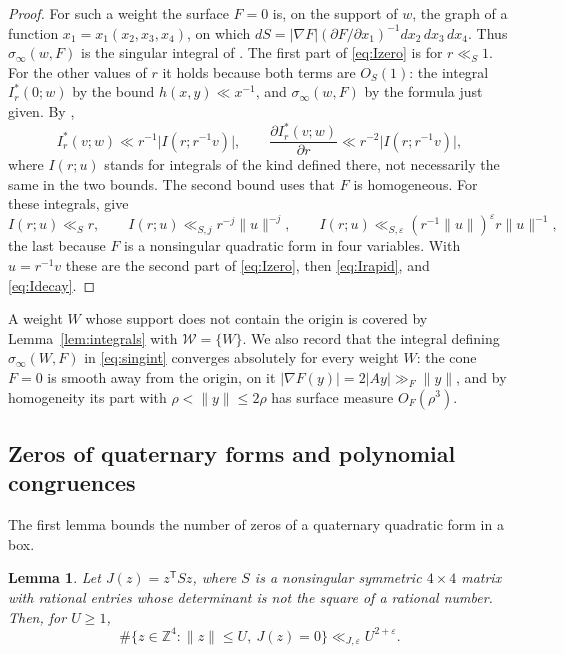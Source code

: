 \documentclass[11pt]{amsart}
\numberwithin{equation}{section}
\numberwithin{figure}{section}
\newtheorem{lemma}{Lemma}[section]
\theoremstyle{definition}
\newcommand{\Z}{\mathbb{Z}}
\newcommand{\eps}{\varepsilon}
\newcommand{\abs}[1]{\lvert #1\rvert}
\begin{document}
\begin{proof}
For such a weight the surface $F=0$ is, on the support of $w$, the
graph of a function $x_1=x_1(x_2,x_3,x_4)$, on which
$dS=\abs{\nabla F}(\partial F/\partial x_1)^{-1}dx_2\,dx_3\,dx_4$.
Thus $\sigma_\infty(w,F)$ is the singular integral of
\cite[Theorem~3]{HB}. The first part of \eqref{eq:Izero} is
\cite[Lemma~13]{HB} for $r\ll_S1$. For the other values of $r$ it
holds because both terms are $O_S(1)$: the integral $I_r^*(0;w)$ by
the bound $h(x,y)\ll x^{-1}$, and $\sigma_\infty(w,F)$ by the formula
just given. By \cite[Lemma~14]{HB},
\[
 I_r^*(v;w)\ll r^{-1}\abs{I(r;r^{-1}v)},\qquad
 \frac{\partial I_r^*(v;w)}{\partial r}\ll r^{-2}\abs{I(r;r^{-1}v)},
\]
where $I(r;u)$ stands for integrals of the kind defined there, not
necessarily the same in the two bounds. The second bound uses that
$F$ is homogeneous. For these integrals,
\cite[Lemmas~15, 18 and~22]{HB} give
\[
 I(r;u)\ll_Sr,\qquad
 I(r;u)\ll_{S,j}r^{-j}\lVert u\rVert^{-j},\qquad
 I(r;u)\ll_{S,\eps}(r^{-1}\lVert u\rVert)^\eps r\lVert u\rVert^{-1},
\]
the last because $F$ is a nonsingular quadratic form in four
variables. With $u=r^{-1}v$ these are the second part of
\eqref{eq:Izero}, then \eqref{eq:Irapid}, and \eqref{eq:Idecay}.
\end{proof}

A weight $W$ whose support does not contain the origin is covered by
Lemma~\ref{lem:integrals} with $\mathcal W=\{W\}$. We also record
that the integral defining $\sigma_\infty(W,F)$ in
\eqref{eq:singint} converges absolutely for every weight $W$: the
cone $F=0$ is smooth away from the origin, on it
$\abs{\nabla F(y)}=2\abs{Ay}\gg_F\lVert y\rVert$, and by homogeneity
its part with $\rho<\lVert y\rVert\le2\rho$ has surface measure
$O_F(\rho^3)$.

\subsection{Zeros of quaternary forms and polynomial congruences}\label{sec:congruences}

The first lemma bounds the number of zeros of a quaternary quadratic
form in a box.

\begin{lemma}\label{lem:quadriccount}
Let $J(z)=z^{\mathsf T}Sz$, where $S$ is a nonsingular symmetric
$4\times4$ matrix with rational entries whose determinant is not the
square of a rational number. Then, for $U\ge1$,
\begin{equation}\label{eq:quadriccount}
 \#\{z\in\Z^4:\lVert z\rVert\le U,\ J(z)=0\}\ll_{J,\eps}U^{2+\eps}.
\end{equation}
\end{lemma}
\end{document}
